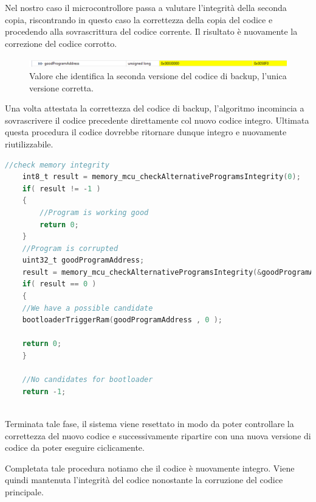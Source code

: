 \documentclass[LaM,binding=0.6cm,oneside]{../sapthesis}
\begin{document}
Nel nostro caso il microcontrollore passa a valutare l'integrità della seconda copia, riscontrando in questo caso la correttezza della copia del codice e procedendo alla sovrascrittura del codice corrente. Il risultato è nuovamente la correzione del codice corrotto.

\begin{figure}[htbp]
\centerline{\includegraphics[scale=0.55]{examples/DebugBootloader.PNG}}
\caption{Valore che identifica la seconda versione del codice di backup, l'unica versione corretta.}
\label{fig}
\end{figure}
\newline

Una volta attestata la correttezza del codice di backup, l'algoritmo incomincia a sovrascrivere il codice precedente direttamente col nuovo codice integro. Ultimata questa procedura il codice dovrebbe ritornare dunque integro e nuovamente riutilizzabile.
\newline
\begin{small}
\begin{lstlisting}[language=C]
    //check memory integrity
    int8_t result = memory_mcu_checkAlternativeProgramsIntegrity(0);
    if( result != -1 )
    {
        //Program is working good
        return 0;    
    }
    //Program is corrupted
    uint32_t goodProgramAddress;
    result = memory_mcu_checkAlternativeProgramsIntegrity(&goodProgramAddress);
    if( result == 0 )
    {
    //We have a possible candidate
    bootloaderTriggerRam(goodProgramAddress , 0 );
    
    return 0;
    }
    
    //No candidates for bootloader
    return -1;
    
\end{lstlisting}
\end{small}
\newline
Terminata tale fase, il sistema viene resettato in modo da poter controllare la correttezza del nuovo codice e successivamente ripartire con una nuova versione di codice da poter eseguire ciclicamente.

Completata tale procedura notiamo che il codice è nuovamente integro. Viene quindi mantenuta l'integrità del codice nonostante la corruzione del codice principale.
\end{document}
